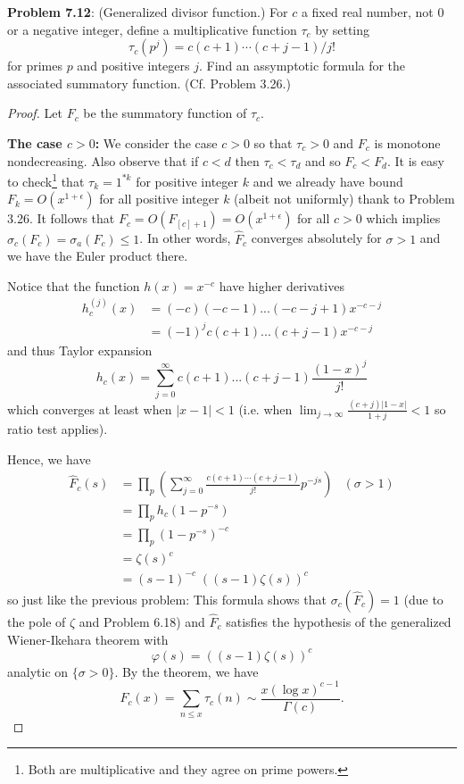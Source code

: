 \documentclass[12pt]{article}
\newcommand{\Fhat}{\widehat{F}}
\begin{document}
\fi

\textbf{Problem 7.12}: (Generalized divisor function.) For $c$ a fixed real number, not 0 or a negative integer, define a multiplicative function $\tau_c$ by setting
$$\tau_c(p^j) = c (c + 1) \cdots (c + j - 1)/j!$$
for primes $p$ and positive integers $j$. Find an assymptotic formula for the associated summatory function. (Cf. Problem 3.26.)

\begin{proof}
Let $F_c$ be the summatory function of $\tau_c$.

\noindent \textbf{The case $c > 0$:} We consider the case $c > 0$ so that $\tau_c > 0$ and $F_c$ is monotone nondecreasing. Also observe that if $c < d$ then $\tau_c < \tau_d$ and so $F_c < F_d$. It is easy to check\footnote{Both are multiplicative and they agree on prime powers.} that $\tau_k = 1^{*k}$ for positive integer $k$ and we already have bound $F_k = O(x^{1 + \epsilon})$ for all positive integer $k$ (albeit not uniformly) thank to Problem 3.26. It follows that $F_c = O(F_{[c] + 1}) = O(x^{1 + \epsilon})$ for all $c > 0$ which implies $\sigma_c(F_c) = \sigma_a(F_c) \leq 1$. In other words, $\Fhat_c$ converges absolutely for $\sigma > 1$ and we have the Euler product there.

Notice that the function $h(x) = x^{-c}$ have higher derivatives
\begin{align*}
h_c^{(j)}(x) &= (-c) (-c - 1) ... (-c - j + 1) x^{- c - j}\\
&= (-1)^j c (c + 1) ... (c + j - 1) x^{- c - j}
\end{align*}
and thus Taylor expansion
$$h_c(x) = \sum_{j = 0}^{\infty} c (c + 1) ... (c + j - 1) \frac{(1 - x)^j}{j!}$$
which converges at least when $|x - 1| < 1$ (i.e. when $\lim_{j \rightarrow \infty} \frac{(c+j) |1-x|}{1 + j} < 1$ so ratio test applies).

Hence, we have
\begin{align*}
\Fhat_c(s) &= \prod_p \left(\sum_{j = 0}^{\infty} \frac{c (c + 1) \cdots (c + j - 1)}{j!} p^{-js}\right) & (\sigma > 1) \\
&= \prod_p h_c(1 - p^{-s})\\
&= \prod_p (1 - p^{-s})^{-c} \\
&= \zeta(s)^c \\
&= (s - 1)^{-c} \; ((s - 1)\zeta(s))^c
\end{align*}
so just like the previous problem: This formula shows that $\sigma_c(\Fhat_c) = 1$ (due to the pole of $\zeta$ and Problem 6.18) and $\Fhat_c$ satisfies the hypothesis of the generalized Wiener-Ikehara theorem with
$$\varphi(s) = ((s - 1)\zeta(s))^c$$
analytic on $\{ \sigma > 0 \}$. By the theorem, we have
$$F_c(x) = \sum_{n \leq x} \tau_c(n) \sim \frac{x (\log x)^{c - 1}}{\Gamma(c)}.$$


\end{proof}
\end{document}
